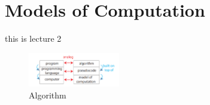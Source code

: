\graphicspath{ {/lecture2} }
\section{Models of Computation}
this is lecture 2
\begin{figure}
    \includegraphics[width=4cm]{Figure1}
    \caption{Algorithm}
    \label{fig:img1}
\end{figure}